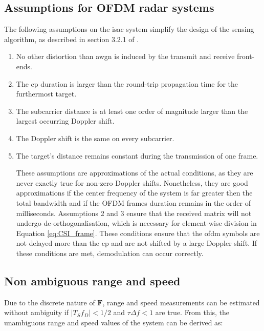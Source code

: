    
    \subsection{Assumptions for OFDM radar systems}
    \label{sub:assumptions_ofdm_radar}
    The following assumptions on the \gls{isac} system simplify the design of the sensing algorithm, as described in section 3.2.1 of \cite{Braun2014OFDMRA}.
    
    \begin{enumerate}
    	\item No other distortion than \gls{awgn} is induced by the transmit and receive front-ends.
    	\item The \gls{cp} duration is larger than the round-trip propagation time for the furthermost target.
    	\item The subcarrier distance is at least one order of magnitude larger than the largest occurring Doppler shift.    	
    	\item The Doppler shift is the same on every subcarrier.
    	\item The target’s distance remains constant during the transmission of one frame.
    	
    	These assumptions are approximations of the actual conditions, as they are never exactly true for non-zero Doppler shifts. Nonetheless, they are good approximations if the center frequency of the system is far greater then the total bandwidth and if the OFDM frames duration remains in the order of milliseconds.
    	Assumptions 2 and 3 ensure that the received matrix will not undergo de-orthogonalisation, which is necessary for element-wise division in Equation \eqref{eq:CSI_frame}. These conditions ensure that the \gls{ofdm} symbols are not delayed more than the \gls{cp} and are not shifted by a large Doppler shift. If these conditions are met, demodulation can occur correctly.
    \end{enumerate}
    
    \subsection{Non ambiguous range and speed}
    
        Due to the discrete nature of $\mathbf{F}$, range and speed measurements can be estimated without ambiguity if $|T_S f_D| < 1/2$ and $\tau \Delta f < 1$ are true.
        From this, the unambiguous range and speed values of the system can be derived as:
        

